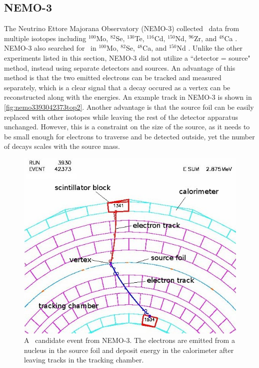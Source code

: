 \subsection{NEMO-3}
The Neutrino Ettore Majorana Observatory (NEMO-3) collected \twonubb~data from multiple isotopes including $^{100}$Mo, $^{82}$Se, $^{130}$Te, $^{116}$Cd, $^{150}$Nd, $^{96}$Zr, and $^{48}$Ca \cite{Bongrand:2011ei}. NEMO-3 also searched for \zeronubb~in $^{100}$Mo, $^{82}$Se, $^{48}$Ca, and $^{150}$Nd \cite{Bongrand:2011ei}\cite{::2016dpe}\cite{Arnold:2016ezh}. Unlike the other experiments listed in this section, NEMO-3 did not utilize a ``detector = source" method, instead using separate detectors and sources. An advantage of this method is that the two emitted electrons can be tracked and measured separately, which is a clear signal that a decay occured as a vertex can be reconstructed along with the energies. An example track in NEMO-3 is shown in \autoref{fig:nemo3393042373top2}. Another advantage is that the source foil can be easily replaced with other isotopes while leaving the rest of the detector apparatus unchanged. However, this is a constraint on the size of the source, as it needs to be small enough for electrons to traverse and be detected outside, yet the number of decays scales with the source mass.

\begin{figure}[htbp]
\centering
\includegraphics[width=0.7\linewidth]{Figures/nemo3_3930_42373_top_2}
\caption{A \zeronubb~candidate event from NEMO-3. The electrons are emitted from a nucleus in the source foil and deposit energy in the calorimeter after leaving tracks in the tracking chamber.}
\label{fig:nemo3393042373top2}
\end{figure}


